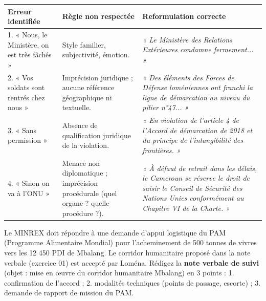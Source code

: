 \documentclass[11pt]{article}
\begin{document}
\begin{corrige}
\begin{center}
\begin{tabularx}{\linewidth}{|X|X|X|}\hline
\rowcolor{popblueL}\textbf{Erreur identifiée} & \textbf{Règle non respectée} & \textbf{Reformulation correcte} \\ \hline
1. « Nous, le Ministère, on est très fâchés » & Style familier, subjectivité, émotion. & \emph{« Le Ministère des Relations Extérieures condamne fermement... »} \\ \hline
2. « Vos soldats sont rentrés chez nous » & Imprécision juridique ; aucune référence géographique ni textuelle. & \emph{« Des éléments des Forces de Défense loméniennes ont franchi la ligne de démarcation au niveau du pilier n°47... »} \\ \hline
3. « Sans permission » & Absence de qualification juridique de la violation. & \emph{« En violation de l'article 4 de l'Accord de démarcation de 2018 et du principe de l'intangibilité des frontières. »} \\ \hline
4. « Sinon on va à l'ONU » & Menace non diplomatique ; imprécision procédurale (quel organe ? quelle procédure ?). & \emph{« À défaut de retrait dans les délais, le Cameroun se réserve le droit de saisir le Conseil de Sécurité des Nations Unies conformément au Chapitre VI de la Charte. »} \\ \hline
\end{tabularx}
\end{center}
\end{corrige}

\begin{exercice}
Le MINREX doit répondre à une demande d'appui logistique du PAM (Programme Alimentaire Mondial) pour l'acheminement de 500 tonnes de vivres vers les 12 450 PDI de Mbalang. Le corridor humanitaire proposé dans la note verbale (exercice 01) est accepté par Loména. Rédigez la \textbf{note verbale de suivi} (objet : mise en œuvre du corridor humanitaire Mbalang) en 3 points : 1. confirmation de l'accord ; 2. modalités techniques (points de passage, escorte) ; 3. demande de rapport de mission du PAM.
\end{exercice}
\end{document}
